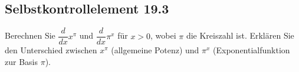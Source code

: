 \documentclass[a4paper,12pt]{article}
\begin{document}
\subsection*{Selbstkontrollelement 19.3}

Berechnen Sie $\dfrac{d}{dx} x^{\pi}$ und $\dfrac{d}{dx} \pi^x$ für $x > 0$,
wobei $\pi$ die Kreiszahl ist. Erklären Sie den Unterschied zwischen
$x^\pi$ (allgemeine Potenz) und $\pi^x$ (Exponentialfunktion zur Basis $\pi$).
\end{document}
